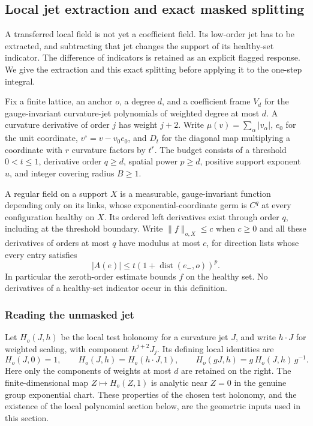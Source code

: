 \subsection{Local jet extraction and exact masked splitting}
\label{sec:local-splitting}
A transferred local field is not yet a coefficient field. Its low-order
jet has to be extracted, and subtracting that jet changes the support of
its healthy-set indicator. The difference of indicators is retained as
an explicit flagged response. We give the extraction and this exact
splitting before applying it to the one-step integral.

Fix a finite lattice, an anchor $o$, a degree $d$, and a coefficient
frame $V_d$ for the gauge-invariant curvature-jet polynomials of weighted
degree at most $d$. A curvature derivative of order $j$ has weight
$j+2$. Write $\mu(v)=\sum_\alpha|v_\alpha|$, $e_0$ for the unit
coordinate, $v^\circ=v-v_0e_0$, and $D_t$ for the diagonal map multiplying
a coordinate with $r$ curvature factors by $t^r$.
The budget consists of a threshold $0<t\le1$, derivative order $q\ge d$,
spatial power $p\ge d$, positive support exponent $u$, and integer
covering radius $B\ge1$.

A regular field on a support $X$ is a measurable, gauge-invariant
function depending only on its links, whose exponential-coordinate germ
is $C^q$ at every configuration healthy on $X$. Its ordered left
 derivatives exist through order $q$, including at the threshold boundary.
Write $\|f\|_{o,X}\le c$ when $c\ge0$ and all these derivatives of
orders at most $q$ have modulus at most $c$, for direction lists whose
every entry satisfies
\[
       |A(e)|\le t(1+\operatorname{dist}(e_-,o))^p.
\]
In particular the zeroth-order estimate bounds $f$ on the healthy set.
No derivatives of a healthy-set indicator occur in this definition.

\subsubsection{Reading the unmasked jet}
Let $H_o(J,h)$ be the local test holonomy for a curvature jet $J$,
and write $h\cdot J$ for weighted scaling, with component
$h^{j+2}J_j$. Its defining local identities are
\[
 H_o(J,0)=1,\qquad H_o(J,h)=H_o(h\cdot J,1),\qquad
 H_o(gJ,h)=g\,H_o(J,h)\,g^{-1}.
\]
Here only the components of weights at most $d$ are retained on the
right. The finite-dimensional map $Z\mapsto H_o(Z,1)$ is analytic near
$Z=0$ in the genuine group exponential chart. These properties of the
chosen test holonomy, and the existence of the local polynomial section
below, are the geometric inputs used in this section.

